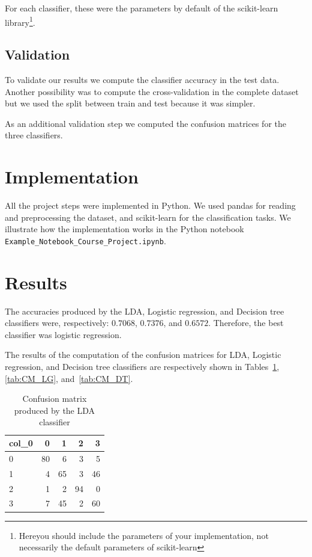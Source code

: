 \documentclass{article} %
\begin{document}
For each classifier, these were the parameters by default of the scikit-learn library\footnote{Hereyou should include the parameters of your implementation, not necessarily the default parameters of scikit-learn}. 
 
\subsection{Validation}
 
 To validate our results we compute the classifier accuracy in the test data. Another possibility was to compute the cross-validation in the complete dataset but we used the split between train and test because it was simpler. 

 As an additional validation step we computed the confusion matrices for the three classifiers.
 
\section{Implementation}

 All the project steps were implemented in Python. We used pandas for reading and preprocessing the dataset, and scikit-learn for the classification tasks. We illustrate how the implementation works in the Python notebook \texttt{Example\_Notebook\_Course\_Project.ipynb}.


\section{Results}

 The accuracies produced by the LDA, Logistic regression, and Decision tree classifiers were, respectively: $0.7068$, $0.7376$, and $0.6572$. Therefore, the best classifier was logistic regression.

 The results of the computation of the confusion matrices for  LDA, Logistic regression, and Decision tree classifiers are respectively shown in Tables~\ref{tab:CM_LDA}, \ref{tab:CM_LG}, and~\ref{tab:CM_DT}.

\begin{table}
\centering
\begin{tabular}{lrrrr}
\toprule \hline
col\_0 &   0 &   1 &   2 &   3 \\\hline
0     &  80 &   6 &   3 &   5 \\\hline
1     &   4 &  65 &   3 &  46 \\\hline
2     &   1 &   2 &  94 &   0 \\\hline
3     &   7 &  45 &   2 &  60 \\\hline
\bottomrule \hline
\end{tabular}
\caption{Confusion matrix produced by the LDA classifier}
 \label{tab:CM_LDA}
\end{table}
\end{document}
